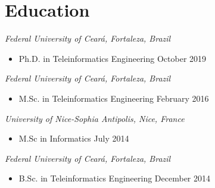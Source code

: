 \section{Education}

{\sl Federal University of Ceará, Fortaleza, Brazil}
\begin{itemize}
	\item[] Ph.D. in Teleinformatics Engineering \hfill October 2019
\end{itemize}

{\sl Federal University of Ceará, Fortaleza, Brazil}
\begin{itemize}
	\item[] M.Sc. in Teleinformatics Engineering \hfill February 2016
\end{itemize}

{\sl University of Nice-Sophia Antipolis, Nice, France}
\begin{itemize}
	\item[] M.Sc in Informatics \hfill July 2014
\end{itemize}

{\sl Federal University of Ceará, Fortaleza, Brazil}
\begin{itemize}
	\item[] B.Sc. in Teleinformatics Engineering \hfill December 2014
\end{itemize}